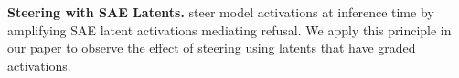 

\textbf{Steering with SAE Latents.}
\citet{brien2025steering} steer model activations at inference time by amplifying SAE latent activations mediating refusal. We apply this principle in our paper to observe the effect of steering using latents that have graded activations.
